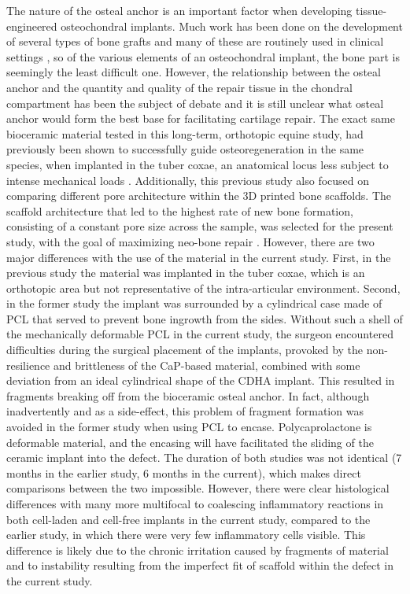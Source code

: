 \documentclass[twocolumn, serif, empirical, authordate, seplic]{jote-article}
\begin{document}
The nature of the osteal anchor is an important factor when developing tissue-engineered osteochondral implants. Much work has been done on the development of several types of bone grafts and many of these are routinely used in clinical settings \parencite{Oryan2014}, so of the various elements of an osteochondral implant, the bone part is seemingly the least difficult one. However, the relationship between the osteal anchor and the quantity and quality of the repair tissue in the chondral compartment has been the subject of debate \parencite{Bal2010} and it is still unclear what osteal anchor would form the best base for facilitating cartilage repair. The exact same bioceramic material tested in this long-term, orthotopic equine study, had previously been shown to successfully guide osteoregeneration in the same species, when implanted in the tuber coxae, an anatomical locus less subject to intense mechanical loads \parencite{Diloksumpan2020}. Additionally, this previous study also focused on comparing different pore architecture within the 3D printed bone scaffolds. The scaffold architecture that led to the highest rate of new bone formation, consisting of a constant pore size across the sample, was selected for the present study, with the goal of maximizing neo-bone repair \parencite{Diloksumpan2020}. However, there are two major differences with the use of the material in the current study. First, in the previous study the material was implanted in the tuber coxae, which is an orthotopic area but not representative of the intra-articular environment. Second, in the former study the implant was surrounded by a cylindrical case made of PCL that served to prevent bone ingrowth from the sides. Without such a shell of the mechanically deformable PCL in the current study, the surgeon encountered difficulties during the surgical placement of the implants, provoked by the non-resilience and brittleness of the CaP-based material, combined with some deviation from an ideal cylindrical shape of the CDHA implant. This resulted in fragments breaking off from the bioceramic osteal anchor. In fact, although inadvertently and as a side-effect, this problem of fragment formation was avoided in the former study when using PCL to encase. Polycaprolactone is deformable material, and the encasing will have facilitated the sliding of the ceramic implant into the defect. The duration of both studies was not identical (7 months in the earlier study, 6 months in the current), which makes direct comparisons between the two impossible. However, there were clear histological differences with many more multifocal to coalescing inflammatory reactions in both cell-laden and cell-free implants in the current study, compared to the earlier study, in which there were very few inflammatory cells visible. This difference is likely due to the chronic irritation caused by fragments of material and to instability resulting from the imperfect fit of scaffold within the defect in the current study.
\end{document}
